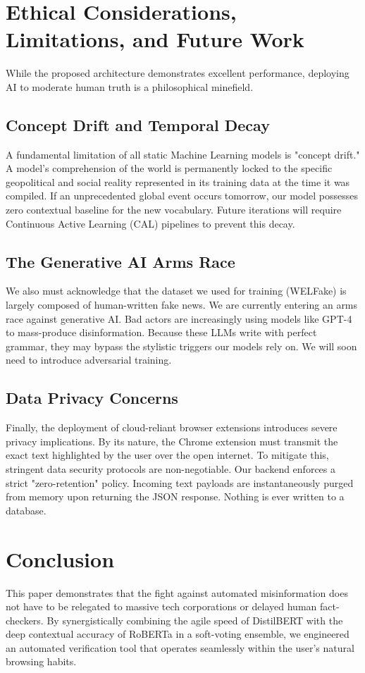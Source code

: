 \documentclass[conference]{IEEEtran}
\begin{document}
\section{Ethical Considerations, Limitations, and Future Work}
While the proposed architecture demonstrates excellent performance, deploying AI to moderate human truth is a philosophical minefield.

\subsection{Concept Drift and Temporal Decay}
A fundamental limitation of all static Machine Learning models is "concept drift." A model's comprehension of the world is permanently locked to the specific geopolitical and social reality represented in its training data at the time it was compiled. If an unprecedented global event occurs tomorrow, our model possesses zero contextual baseline for the new vocabulary. Future iterations will require Continuous Active Learning (CAL) pipelines to prevent this decay.

\subsection{The Generative AI Arms Race}
We also must acknowledge that the dataset we used for training (WELFake) is largely composed of human-written fake news. We are currently entering an arms race against generative AI. Bad actors are increasingly using models like GPT-4 to mass-produce disinformation. Because these LLMs write with perfect grammar, they may bypass the stylistic triggers our models rely on. We will soon need to introduce adversarial training.

\subsection{Data Privacy Concerns}
Finally, the deployment of cloud-reliant browser extensions introduces severe privacy implications. By its nature, the Chrome extension must transmit the exact text highlighted by the user over the open internet. To mitigate this, stringent data security protocols are non-negotiable. Our backend enforces a strict "zero-retention" policy. Incoming text payloads are instantaneously purged from memory upon returning the JSON response. Nothing is ever written to a database. 

\section{Conclusion}
This paper demonstrates that the fight against automated misinformation does not have to be relegated to massive tech corporations or delayed human fact-checkers. By synergistically combining the agile speed of DistilBERT with the deep contextual accuracy of RoBERTa in a soft-voting ensemble, we engineered an automated verification tool that operates seamlessly within the user's natural browsing habits. 
\end{document}
